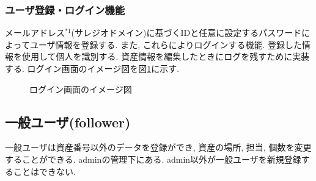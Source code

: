 \documentclass[11ptm]{jsarticle}
\begin{document}
\subsubsection{ユーザ登録・ログイン機能}
\label{subsubsec:ユーザ登録・ログイン機能}
メールアドレス$^{*1}$(サレジオドメイン)に基づくIDと任意に設定するパスワードによってユーザ情報を登録する. また, これらによりログインする機能. 登録した情報を使用して個人を識別する. 資産情報を編集したときにログを残すために実装する. ログイン画面のイメージ図を図\ref{fig:ログイン画面のイメージ図}に示す. \par
\begin{figure}[h]
  \centering
  \caption{\label{fig:ログイン画面のイメージ図}ログイン画面のイメージ図}
\end{figure}

\clearpage
\subsection{一般ユーザ(follower)}
\label{subsec:一般ユーザ(follower)}
一般ユーザは資産番号以外のデータを登録ができ, 資産の場所, 担当, 個数を変更することができる. adminの管理下にある. admin以外が一般ユーザを新規登録することはできない.

\end{document}
